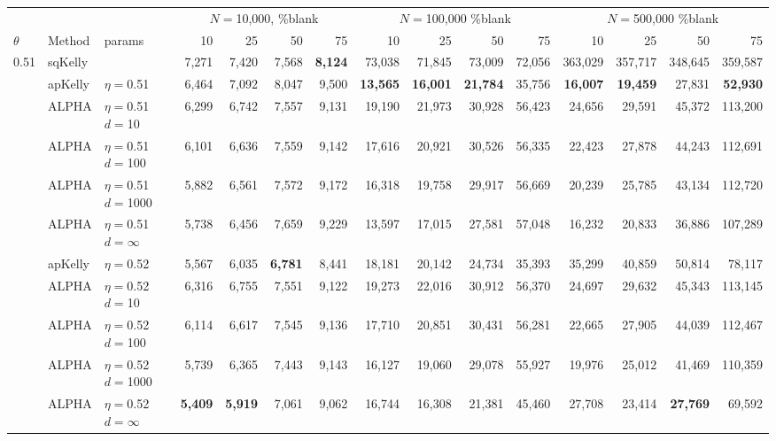 \documentclass[12pt,runningheads]{llncs}
\begin{document}
{\begin{table}
\centering
\tiny
\begin{tabular}{lll|rrrr|rrrr|rrrr} 
& & & \multicolumn{4}{|c|}{$N=$10,000, \%blank} &  \multicolumn{4}{|c|}{$N=$100,000 \%blank} & \multicolumn{4}{|c}{$N=$500,000 \%blank} \\ 
$\theta$ & Method & params & 10 & 25 & 50 & 75  & 10 & 25 & 50 & 75  & 10 & 25 & 50 & 75  \\
\hline 0.51 & sqKelly & & 7,271  & 7,420  & 7,568  & \bf{8,124}  & 73,038  & 71,845  & 73,009  & 72,056  & 363,029  & 357,717  & 348,645  & 359,587  \\
\cline{2-15} & apKelly & $\eta=$0.51 & 6,464  & 7,092  & 8,047  & 9,500  & \bf{13,565}  & \bf{16,001}  & \bf{21,784}  & 35,756  & \bf{16,007}  & \bf{19,459}  & 27,831  & \bf{52,930}  \\
& ALPHA & $\eta=$0.51 $d=$10 & 6,299  & 6,742  & 7,557  & 9,131  & 19,190  & 21,973  & 30,928  & 56,423  & 24,656  & 29,591  & 45,372  & 113,200  \\
& ALPHA & $\eta=$0.51 $d=$100 & 6,101  & 6,636  & 7,559  & 9,142  & 17,616  & 20,921  & 30,526  & 56,335  & 22,423  & 27,878  & 44,243  & 112,691  \\
& ALPHA & $\eta=$0.51 $d=$1000 & 5,882  & 6,561  & 7,572  & 9,172  & 16,318  & 19,758  & 29,917  & 56,669  & 20,239  & 25,785  & 43,134  & 112,720  \\
 & ALPHA & $\eta=$0.51 $d=\infty$ & 5,738  & 6,456  & 7,659  & 9,229  & 13,597  & 17,015  & 27,581  & 57,048  & 16,232  & 20,833  & 36,886  & 107,289  \\
\cline{2-15} & apKelly & $\eta=$0.52 & 5,567  & 6,035  & \bf{6,781}  & 8,441  & 18,181  & 20,142  & 24,734  & 35,393  & 35,299  & 40,859  & 50,814  & 78,117  \\
& ALPHA & $\eta=$0.52 $d=$10 & 6,316  & 6,755  & 7,551  & 9,122  & 19,273  & 22,016  & 30,912  & 56,370  & 24,697  & 29,632  & 45,343  & 113,145  \\
& ALPHA & $\eta=$0.52 $d=$100 & 6,114  & 6,617  & 7,545  & 9,136  & 17,710  & 20,851  & 30,431  & 56,281  & 22,665  & 27,905  & 44,039  & 112,467  \\
& ALPHA & $\eta=$0.52 $d=$1000 & 5,739  & 6,365  & 7,443  & 9,143  & 16,127  & 19,060  & 29,078  & 55,927  & 19,976  & 25,012  & 41,469  & 110,359  \\
 & ALPHA & $\eta=$0.52 $d=\infty$ & \bf{5,409}  & \bf{5,919}  & 7,061  & 9,062  & 16,744  & 16,308  & 21,381  & 45,460  & 27,708  & 23,414  & \bf{27,769}  & 69,592  \\

\end{tabular}
\end{table}}
\end{document}
